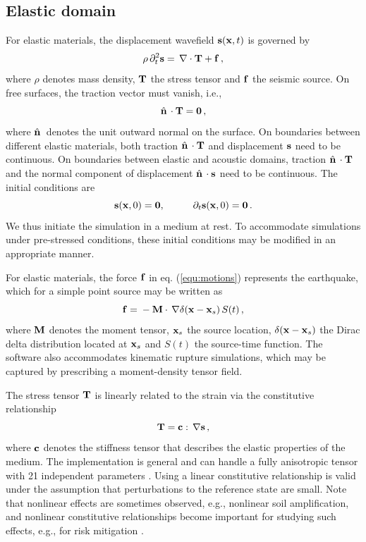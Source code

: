 \documentclass[referee,extra]{gji}
\newcommand{\bequ}{\begin{equation} }
\newcommand{\eequ}{\end{equation} }
\newcommand{\bnabla}{ \, {\bf \nabla } }
\newcommand{\bs}{ {\bf s } }
\newcommand{\bc}{ {\bf c } }
\newcommand{\bT}{ {\bf T } }
\newcommand{\bforce}{ {\bf f } }
\newcommand{\bM}{ {\bf M } }
\newcommand{\bx}{ {\bf x } }
\newcommand{\bnormal}{ \hat{ \bf{n} } \, }
\begin{document}
\subsection{Elastic domain}\label{subsec:elastic}

For elastic materials, the displacement wavefield $\bs(\bx, t)$ is governed by
\bequ \label{equ:motions}
\rho\, \partial_t^2 \bs = \bnabla \cdot \bT + \bforce \,,
\eequ
where $\rho$ denotes mass density, $\bT$ the stress tensor and $\bforce$ the seismic source.
On free surfaces, the traction vector must vanish, i.e.,
\bequ
\bnormal \cdot \bT = {\bf 0}\,,
\eequ
where $\bnormal$ denotes the unit outward normal on the surface.
On boundaries between different elastic materials,
both traction $\bnormal \cdot \bT$ and displacement $\bs$ need to be continuous.
On boundaries between elastic and acoustic domains,
traction $\bnormal \cdot \bT$ and the normal component of displacement $\bnormal \cdot \bs$ need to be continuous.
The initial conditions are
\bequ
\bs(\bx,0) = {\bf 0}, \hspace{10mm} \partial_t \bs(\bx,0) = {\bf 0}\,.
\eequ
We thus initiate the simulation in a medium at rest.
To accommodate simulations under pre-stressed conditions,
these initial conditions may be modified in an appropriate manner.

For elastic materials, the force $\bforce$ in eq. (\ref{equ:motions}) represents the earthquake,
which for a simple point source may be written as
\bequ
\bforce = \mbox{}- \bM\cdot \bnabla \delta(\bx - \bx_s ) \, S(t) \,,
\eequ
where $\bM$ denotes the moment tensor, $\bx_s$ the source location,
$\delta(\bx - \bx_s)$ the Dirac delta distribution located at $\bx_s$ and $S(t)$ the source-time function.
The software also accommodates kinematic rupture simulations,
which may be captured by prescribing a moment-density tensor field.

The stress tensor $\bT$ is linearly related to the strain via the constitutive relationship
\bequ
\bT = \bc : \bnabla \bs\, ,
\eequ
where $\bc$ denotes the stiffness tensor that describes the elastic properties of the medium.
The implementation is general and can handle a fully anisotropic tensor with 21 independent parameters
\citep{ChTr07,SiLiTrTr07a,SiLiTrTr07b}.
Using a linear constitutive relationship is valid under the assumption that perturbations to the reference state
are small.
Note that nonlinear effects are sometimes observed, e.g., nonlinear soil amplification,
and nonlinear constitutive relationships become important for studying such effects,
e.g., for risk mitigation \citep{XuBiGhWa03,DuDeFoKoRo10}.
\end{document}
